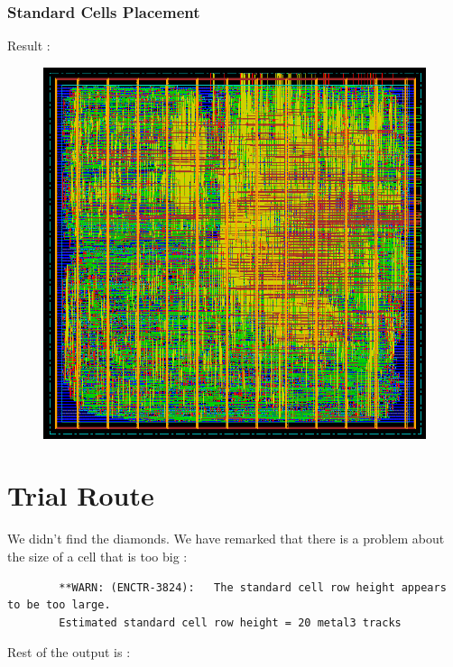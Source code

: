 \documentclass[11pt,a4paper,sans,dvipsnames]{report}
\begin{document}
	\subsubsection*{Standard Cells Placement}
	Result : 
	\begin{figure}[h!]
		\centering
		\includegraphics[width=\linewidth, frame]{images/place_std_cells.png}
		\label{fig:place_std_cells}
	\end{figure}

	\newpage
	\section{Trial Route}
	We didn't find the diamonds. We have remarked that there is a problem about the size of a cell that is too big :
	\begin{lstlisting}
		**WARN: (ENCTR-3824):	The standard cell row height appears to be too large.
		Estimated standard cell row height = 20 metal3 tracks
	\end{lstlisting}

	Rest of the output is :
\end{document}
